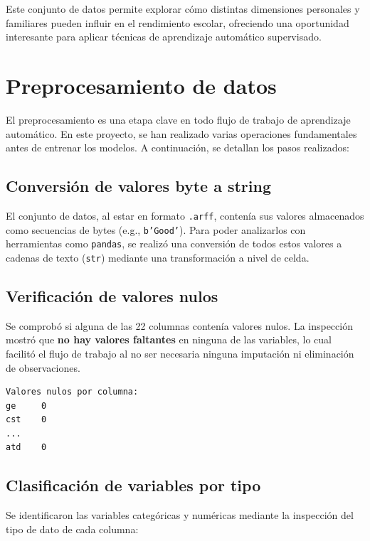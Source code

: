 \documentclass[11pt,a4paper]{article}
\begin{document}
\medskip

Este conjunto de datos permite explorar cómo distintas dimensiones personales y familiares pueden influir en el rendimiento escolar, ofreciendo una oportunidad interesante para aplicar técnicas de aprendizaje automático supervisado.

\section{Preprocesamiento de datos}

El preprocesamiento es una etapa clave en todo flujo de trabajo de aprendizaje automático. En este proyecto, se han realizado varias operaciones fundamentales antes de entrenar los modelos. A continuación, se detallan los pasos realizados:

\subsection{Conversión de valores byte a string}

El conjunto de datos, al estar en formato \texttt{.arff}, contenía sus valores almacenados como secuencias de bytes (e.g., \texttt{b'Good'}). Para poder analizarlos con herramientas como \texttt{pandas}, se realizó una conversión de todos estos valores a cadenas de texto (\texttt{str}) mediante una transformación a nivel de celda.

\medskip

\subsection{Verificación de valores nulos}

Se comprobó si alguna de las 22 columnas contenía valores nulos. La inspección mostró que \textbf{no hay valores faltantes} en ninguna de las variables, lo cual facilitó el flujo de trabajo al no ser necesaria ninguna imputación ni eliminación de observaciones.

\begin{verbatim}
Valores nulos por columna:
ge     0
cst    0
...
atd    0
\end{verbatim}

\medskip

\subsection{Clasificación de variables por tipo}

Se identificaron las variables categóricas y numéricas mediante la inspección del tipo de dato de cada columna:
\end{document}
